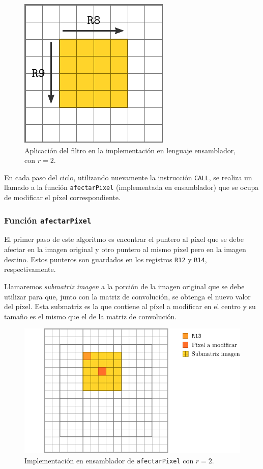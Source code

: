      \begin{figure}[h]
        \centering \includegraphics{imagenes/ciclos-asm.pdf}
        \caption{Aplicación del filtro en la implementación en lenguaje ensamblador, con $r = 2$.} \label{fig:ciclos-asm}
      \end{figure}

      En cada paso del ciclo, utilizando nuevamente la instrucción \texttt{CALL}, se realiza un llamado a la función \texttt{afectarPixel} (implementada en ensamblador) que se ocupa de modificar el píxel correspondiente. 

      \subsubsection*{Función \texttt{afectarPixel}}
        El primer paso de este algoritmo es encontrar el puntero al píxel que se debe afectar en la imagen original y otro puntero al mismo píxel pero en la imagen destino. Estos punteros son guardados en los registros \texttt{R12} y \texttt{R14}, respectivamente.   

        Llamaremos \emph{submatriz imagen} a la porción de la imagen original que se debe utilizar para que, junto con la matriz de convolución, se obtenga el nuevo valor del píxel. Esta submatriz es la que contiene al píxel a modificar en el centro y su tamaño es el mismo que el de la matriz de convolución. 
        
        \begin{figure}[h]
          \centering \includegraphics{imagenes/afectar-pixel-asm.pdf}
          \caption{Implementación en ensamblador de \texttt{afectarPixel} con $r = 2$.} \label{fig:afectar-pixel-asm}
        \end{figure}

